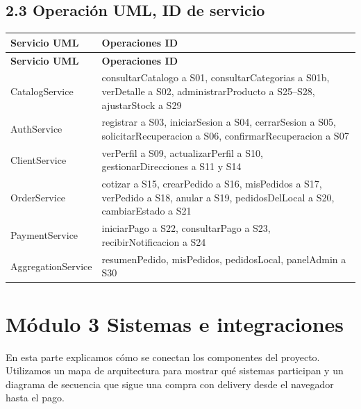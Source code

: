 \documentclass[10pt,letterpaper]{article}
\begin{document}
\subsection*{2.3 Operación UML, ID de servicio}
{\footnotesize
\begin{longtable}{|P{\tabcolsep\relax}|P{\tabcolsep\relax}|}
\hline
\textbf{Servicio UML} & \textbf{Operaciones  ID} \\ \hline
\endfirsthead
\hline
\textbf{Servicio UML} & \textbf{Operaciones  ID} \\ \hline
\endhead
CatalogService & consultarCatalogo a S01,  consultarCategorias a S01b, verDetalle a S02, administrarProducto a S25–S28, ajustarStock a S29 \\ \hline
AuthService & registrar a S03, iniciarSesion a S04, cerrarSesion a S05, solicitarRecuperacion a S06, confirmarRecuperacion a S07 \\ \hline
ClientService & verPerfil a S09, actualizarPerfil a S10, gestionarDirecciones a S11 y S14 \\ \hline
OrderService & cotizar a S15, crearPedido a S16, misPedidos a S17, verPedido a S18, anular a S19, pedidosDelLocal a S20, cambiarEstado a S21 \\ \hline
PaymentService & iniciarPago a S22, consultarPago a S23, recibirNotificacion a S24 \\ \hline
AggregationService & resumenPedido, misPedidos, pedidosLocal, panelAdmin a S30 \\ \hline
\end{longtable}}

\section*{Módulo 3 Sistemas e integraciones}
En esta parte explicamos cómo se conectan los componentes del proyecto. Utilizamos un mapa de arquitectura para mostrar qué sistemas participan y un diagrama de secuencia que sigue una compra con delivery desde el navegador hasta el pago.
\end{document}
